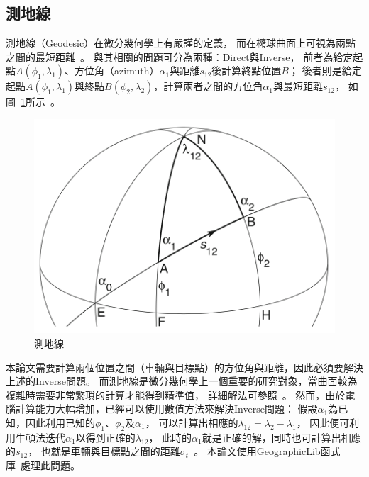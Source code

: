 \subsection{測地線}
測地線（Geodesic）在微分幾何學上有嚴謹的定義，
而在橢球曲面上可視為兩點之間的最短距離~\cite{Karney:2013:Algorithms_for_Geodesics}。
與其相關的問題可分為兩種：Direct與Inverse，
前者為給定起點$A(\phi_1,\lambda_1)$、方位角（azimuth）$\alpha_1$與距離$s_{12}$後計算終點位置$B$；
後者則是給定起點$A(\phi_1,\lambda_1)$與終點$B(\phi_2,\lambda_2)$，計算兩者之間的方位角$\alpha_1$與最短距離$s_{12}$，
如圖~\ref{f:geodesic}所示~\cite{Jekeli:2006:GRSinGeodesy}。
\begin{figure}[h!]
	\centering
	\includegraphics[width=.5\textwidth]{figures/algorithm/geodesic}
	\caption{測地線}
	\label{f:geodesic}
\end{figure}

本論文需要計算兩個位置之間（車輛與目標點）的方位角與距離，因此必須要解決上述的Inverse問題。
而測地線是微分幾何學上一個重要的研究對象，當曲面較為複雜時需要非常繁瑣的計算才能得到精準值，
詳細解法可參照~\cite{Karney:2013:Algorithms_for_Geodesics,Jekeli:2006:GRSinGeodesy}。
然而，由於電腦計算能力大幅增加，已經可以使用數值方法來解決Inverse問題：
假設$\alpha_1$為已知，因此利用已知的$\phi_1$、$\phi_2$及$\alpha_1$，
可以計算出相應的$\lambda_{12} = \lambda_2 - \lambda_1$，
因此便可利用牛頓法迭代$\alpha_1$以得到正確的$\lambda_{12}$，
此時的$\alpha_1$就是正確的解，同時也可計算出相應的$s_{12}$，
也就是車輛與目標點之間的距離$\sigma_t$~\cite{Karney:2013:Algorithms_for_Geodesics}。
本論文使用GeographicLib函式庫~\cite{website:GeographicLib}處理此問題。

